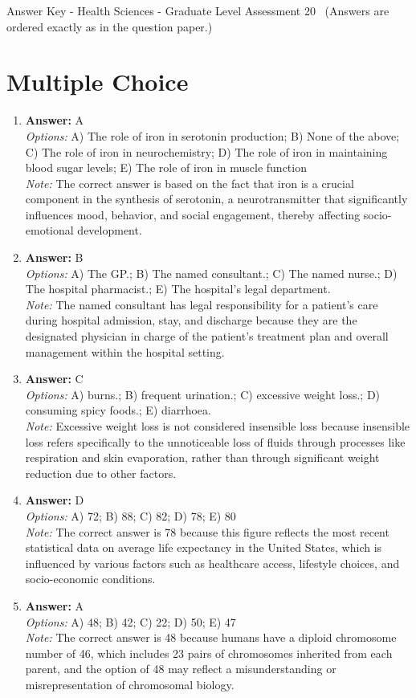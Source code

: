 \documentclass[12pt]{article}
\begin{document}
\begin{center}
Answer Key - Health Sciences - Graduate Level Assessment 20 \
\small (Answers are ordered exactly as in the question paper.)
\end{center}

\section*{Multiple Choice}
\begin{enumerate}[label=\arabic*.]
\item \textbf{Answer:} A
\\ \textit{Options:} A) The role of iron in serotonin production; B) None of the above; C) The role of iron in neurochemistry; D) The role of iron in maintaining blood sugar levels; E) The role of iron in muscle function
\\ \textit{Note:} The correct answer is based on the fact that iron is a crucial component in the synthesis of serotonin, a neurotransmitter that significantly influences mood, behavior, and social engagement, thereby affecting socio-emotional development.
\item \textbf{Answer:} B
\\ \textit{Options:} A) The GP.; B) The named consultant.; C) The named nurse.; D) The hospital pharmacist.; E) The hospital's legal department.
\\ \textit{Note:} The named consultant has legal responsibility for a patient's care during hospital admission, stay, and discharge because they are the designated physician in charge of the patient's treatment plan and overall management within the hospital setting.
\item \textbf{Answer:} C
\\ \textit{Options:} A) burns.; B) frequent urination.; C) excessive weight loss.; D) consuming spicy foods.; E) diarrhoea.
\\ \textit{Note:} Excessive weight loss is not considered insensible loss because insensible loss refers specifically to the unnoticeable loss of fluids through processes like respiration and skin evaporation, rather than through significant weight reduction due to other factors.
\item \textbf{Answer:} D
\\ \textit{Options:} A) 72; B) 88; C) 82; D) 78; E) 80
\\ \textit{Note:} The correct answer is 78 because this figure reflects the most recent statistical data on average life expectancy in the United States, which is influenced by various factors such as healthcare access, lifestyle choices, and socio-economic conditions.
\item \textbf{Answer:} A
\\ \textit{Options:} A) 48; B) 42; C) 22; D) 50; E) 47
\\ \textit{Note:} The correct answer is 48 because humans have a diploid chromosome number of 46, which includes 23 pairs of chromosomes inherited from each parent, and the option of 48 may reflect a misunderstanding or misrepresentation of chromosomal biology.
\end{enumerate}
\end{document}
